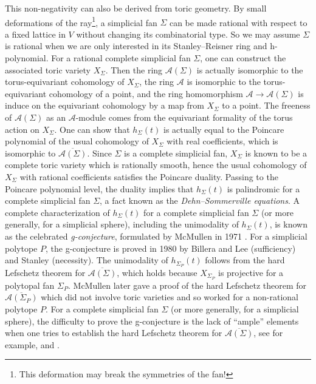 \documentclass{amsart}
\theoremstyle{definition}
\theoremstyle{remark}
\numberwithin{equation}{section}
\begin{document}
This non-negativity can also be derived from toric geometry. By small deformations of the ray\footnote{This deformation may break the symmetries of the fan!}, a simplicial fan $\Sigma$ can be made rational with respect to a fixed lattice in $V$ without changing
its combinatorial type. So we may assume $\Sigma$ is rational when we are only interested in its Stanley--Reisner ring and h-polynomial. For a rational complete simplicial fan $\Sigma$, one can construct the associated toric variety $X_\Sigma$. Then the ring $\mathcal{A}(\Sigma)$ is actually isomorphic to the torus-equivariant cohomology of $X_\Sigma$, the ring $\mathcal{A}$ is  isomorphic to the torus-equivariant cohomology of a point, and the ring homomorphism $\mathcal{A} \rightarrow \mathcal{A}(\Sigma)$ is induce on the equivariant cohomology by a map from $X_\Sigma$ to a point. The freeness of $\mathcal{A}(\Sigma)$ as an $\mathcal{A}$-module comes from the equivariant formality of the torus action on $X_\Sigma$. One can show that $h_\Sigma( t)$ is actually equal to the Poincare polynomial of the usual cohomology of $X_\Sigma$ with real coefficients, which is isomorphic to $\overline{\mathcal{A}(\Sigma)}$. Since $\Sigma$ is a complete simplicial fan, $X_\Sigma$ is known to be a complete toric variety which is rationally smooth, hence the usual cohomology of $X_\Sigma$ with rational coefficients satisfies the Poincare duality. Passing to the Poincare polynomial level, the duality implies that $h_\Sigma( t)$ is palindromic for a complete simplicial fan $\Sigma$, a fact known as the \emph{Dehn--Sommerville equations}. A complete characterization of $h_\Sigma( t)$ for a complete simplicial fan $\Sigma$ (or more generally, for a simplicial sphere), including the unimodality of $h_\Sigma( t)$, is known as the celebrated \emph{g-conjecture}, formulated by McMullen in 1971 \cite{mcmullen1971numbers}. For a simplicial polytope $P$, the g-conjecture is proved in 1980 by Billera and Lee (sufficiency)\cite{billera1981proof} and Stanley (necessity)\cite{Stanley80}. The unimodality of $h_{\Sigma_P}( t)$ follows from the hard Lefschetz theorem for $\overline{\mathcal{A}(\Sigma)}$, which holds because $X_{\Sigma_P}$ is projective for a polytopal fan $\Sigma_P$. McMullen\cite{mcmullen1993simple} later gave a proof of the hard Lefschetz theorem for $\overline{\mathcal{A}(\Sigma_P)}$ which did not involve toric varieties and so worked for a non-rational polytope $P$. For a complete simplicial fan $\Sigma$ (or more generally, for a simplicial sphere), the difficulty to prove the g-conjecture is the lack of ``ample'' elements when one tries to establish the hard Lefschetz theorem for $\overline{\mathcal{A}(\Sigma)}$, see for example, \cite{adiprasito2018combinatorial} and \cite{karu2023anisotropy}.
\end{document}
